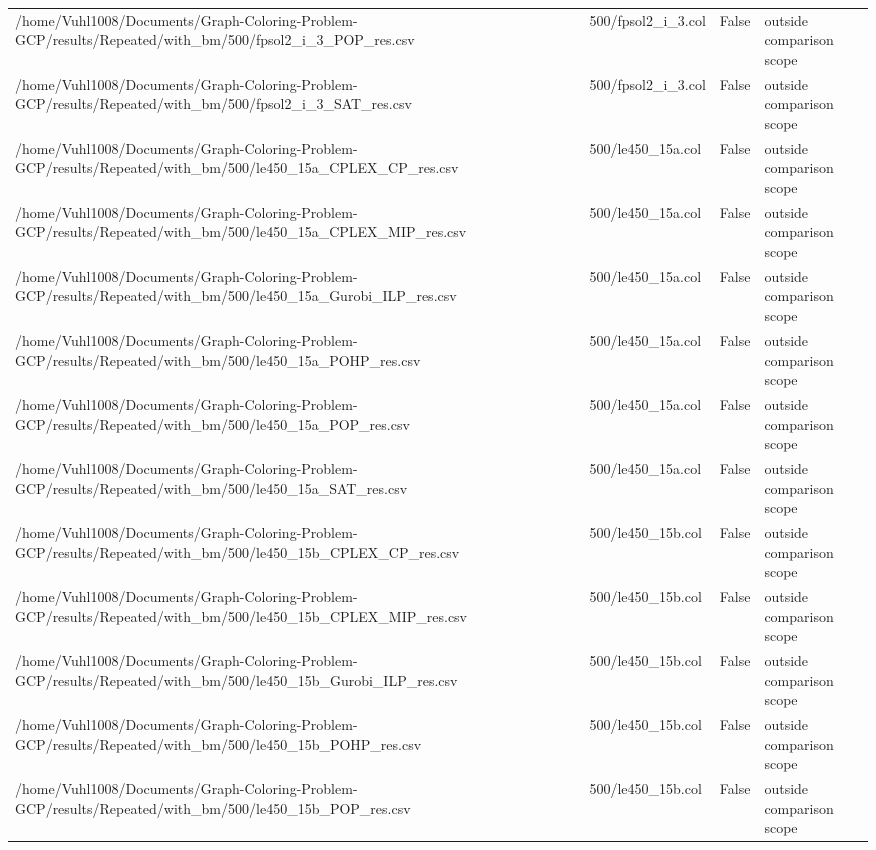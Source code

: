 \begin{table}[htbp]
\begin{tabular}{llll}
/home/Vuhl1008/Documents/Graph-Coloring-Problem-GCP/results/Repeated/with\_bm/500/fpsol2\_i\_3\_POP\_res.csv & 500/fpsol2\_i\_3.col & False & outside comparison scope \\
/home/Vuhl1008/Documents/Graph-Coloring-Problem-GCP/results/Repeated/with\_bm/500/fpsol2\_i\_3\_SAT\_res.csv & 500/fpsol2\_i\_3.col & False & outside comparison scope \\
/home/Vuhl1008/Documents/Graph-Coloring-Problem-GCP/results/Repeated/with\_bm/500/le450\_15a\_CPLEX\_CP\_res.csv & 500/le450\_15a.col & False & outside comparison scope \\
/home/Vuhl1008/Documents/Graph-Coloring-Problem-GCP/results/Repeated/with\_bm/500/le450\_15a\_CPLEX\_MIP\_res.csv & 500/le450\_15a.col & False & outside comparison scope \\
/home/Vuhl1008/Documents/Graph-Coloring-Problem-GCP/results/Repeated/with\_bm/500/le450\_15a\_Gurobi\_ILP\_res.csv & 500/le450\_15a.col & False & outside comparison scope \\
/home/Vuhl1008/Documents/Graph-Coloring-Problem-GCP/results/Repeated/with\_bm/500/le450\_15a\_POHP\_res.csv & 500/le450\_15a.col & False & outside comparison scope \\
/home/Vuhl1008/Documents/Graph-Coloring-Problem-GCP/results/Repeated/with\_bm/500/le450\_15a\_POP\_res.csv & 500/le450\_15a.col & False & outside comparison scope \\
/home/Vuhl1008/Documents/Graph-Coloring-Problem-GCP/results/Repeated/with\_bm/500/le450\_15a\_SAT\_res.csv & 500/le450\_15a.col & False & outside comparison scope \\
/home/Vuhl1008/Documents/Graph-Coloring-Problem-GCP/results/Repeated/with\_bm/500/le450\_15b\_CPLEX\_CP\_res.csv & 500/le450\_15b.col & False & outside comparison scope \\
/home/Vuhl1008/Documents/Graph-Coloring-Problem-GCP/results/Repeated/with\_bm/500/le450\_15b\_CPLEX\_MIP\_res.csv & 500/le450\_15b.col & False & outside comparison scope \\
/home/Vuhl1008/Documents/Graph-Coloring-Problem-GCP/results/Repeated/with\_bm/500/le450\_15b\_Gurobi\_ILP\_res.csv & 500/le450\_15b.col & False & outside comparison scope \\
/home/Vuhl1008/Documents/Graph-Coloring-Problem-GCP/results/Repeated/with\_bm/500/le450\_15b\_POHP\_res.csv & 500/le450\_15b.col & False & outside comparison scope \\
/home/Vuhl1008/Documents/Graph-Coloring-Problem-GCP/results/Repeated/with\_bm/500/le450\_15b\_POP\_res.csv & 500/le450\_15b.col & False & outside comparison scope \\

\end{tabular}
\end{table}
